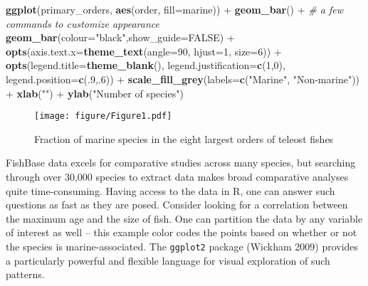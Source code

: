 \documentclass[author-year]{elsarticle} %
\newenvironment{Shaded}{}{}
\newcommand{\KeywordTok}[1]{\textcolor[rgb]{0.00,0.44,0.13}{\textbf{{#1}}}}
\newcommand{\DataTypeTok}[1]{\textcolor[rgb]{0.56,0.13,0.00}{{#1}}}
\newcommand{\DecValTok}[1]{\textcolor[rgb]{0.25,0.63,0.44}{{#1}}}
\newcommand{\StringTok}[1]{\textcolor[rgb]{0.25,0.44,0.63}{{#1}}}
\newcommand{\CommentTok}[1]{\textcolor[rgb]{0.38,0.63,0.69}{\textit{{#1}}}}
\newcommand{\OtherTok}[1]{\textcolor[rgb]{0.00,0.44,0.13}{{#1}}}
\newcommand{\NormalTok}[1]{{#1}}
\begin{document}
\begin{Shaded}
\end{Shaded}
\begin{Shaded}
\begin{Highlighting}[]
\KeywordTok{ggplot}\NormalTok{(primary_orders, }\KeywordTok{aes}\NormalTok{(order, }\DataTypeTok{fill=}\NormalTok{marine)) + }\KeywordTok{geom_bar}\NormalTok{() + }
\CommentTok{# a few commands to customize appearance }
  \KeywordTok{geom_bar}\NormalTok{(}\DataTypeTok{colour=}\StringTok{"black"}\NormalTok{,}\DataTypeTok{show_guide=}\OtherTok{FALSE}\NormalTok{) +  }
  \KeywordTok{opts}\NormalTok{(}\DataTypeTok{axis.text.x=}\KeywordTok{theme_text}\NormalTok{(}\DataTypeTok{angle=}\DecValTok{90}\NormalTok{, }\DataTypeTok{hjust=}\DecValTok{1}\NormalTok{, }\DataTypeTok{size=}\DecValTok{6}\NormalTok{)) + }
  \KeywordTok{opts}\NormalTok{(}\DataTypeTok{legend.title=}\KeywordTok{theme_blank}\NormalTok{(), }\DataTypeTok{legend.justification=}\KeywordTok{c}\NormalTok{(}\DecValTok{1}\NormalTok{,}\DecValTok{0}\NormalTok{), }\DataTypeTok{legend.position=}\KeywordTok{c}\NormalTok{(.}\DecValTok{9}\NormalTok{,.}\DecValTok{6}\NormalTok{)) +}
  \KeywordTok{scale_fill_grey}\NormalTok{(}\DataTypeTok{labels=}\KeywordTok{c}\NormalTok{(}\StringTok{"Marine"}\NormalTok{, }\StringTok{"Non-marine"}\NormalTok{)) + }
  \KeywordTok{xlab}\NormalTok{(}\StringTok{""}\NormalTok{) + }\KeywordTok{ylab}\NormalTok{(}\StringTok{"Number of species"}\NormalTok{)}
\end{Highlighting}
\end{Shaded}
\begin{figure}[htbp]
\centering
\texttt{[image: figure/Figure1.pdf]}
\caption{Fraction of marine species in the eight largest orders of
teleost fishes}
\end{figure}

FishBase data excels for comparative studies across many species, but
searching through over 30,000 species to extract data makes broad
comparative analyses quite time-consuming. Having access to the data in
R, one can answer such questions as fast as they are posed. Consider
looking for a correlation between the maximum age and the size of fish.
One can partition the data by any variable of interest as well -- this
example color codes the points based on whether or not the species is
marine-associated. The \texttt{ggplot2} package (Wickham 2009) provides
a particularly powerful and flexible language for visual exploration of
such patterns.
\end{document}
